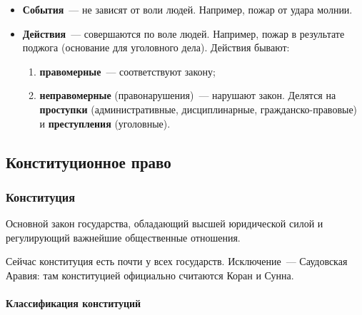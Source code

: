 \documentclass[12pt]{article}
\begin{document}
	\begin{itemize}
		\item \textbf{События}~--- не зависят от воли людей. Например, пожар от удара молнии.
		\item \textbf{Действия}~--- совершаются по воле людей. Например, пожар в результате поджога (основание для уголовного дела). Действия бывают:
		\begin{enumerate}
			\item \textbf{правомерные}~--- соответствуют закону;
			\item \textbf{неправомерные} (правонарушения)~--- нарушают закон. Делятся на \textbf{проступки} (административные, дисциплинарные, гражданско-правовые) и \textbf{преступления} (уголовные).
		\end{enumerate}
	\end{itemize}

	\subsection{Конституционное право}
	
	\subsubsection{Конституция}
	
	\begin{definition}[Конституция]
		Основной закон государства, обладающий высшей юридической силой и регулирующий важнейшие общественные отношения.
	\end{definition}
	
	\begin{note}
		Сейчас конституция есть почти у всех государств. Исключение~--- Саудовская Аравия: там конституцией официально считаются Коран и Сунна.
	\end{note}
	
	\paragraph{Классификация конституций}
	
\end{document}
